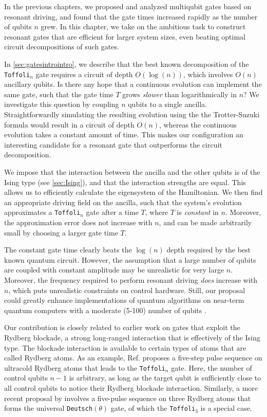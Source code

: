 In the previous chapters, we proposed and analyzed multiqubit gates based on resonant driving, and found that the gate times increased rapidly as the number of qubits $n$ grew. In this chapter, we take on the ambitious task to construct resonant gates that are efficient for larger system sizes, even beating optimal circuit decompositions of such gates. 

In \cref{sec:gatesintrointro}, we describe that the best known decomposition of the \texttt{Toffoli}$_n$ gate requires a circuit of depth $O(\log(n))$, which involves $O(n)$ ancillary qubits. Is there any hope that a continuous evolution can implement the same gate, such that the gate time $T$ grows \emph{slower} than logarithmically in $n$? We investigate this question by coupling $n$ qubits to a single ancilla. Straightforwardly simulating the resulting evolution using the the Trotter-Suzuki formula \cite{Lloyd1996} would result in a circuit of depth $O(n)$, whereas the continuous evolution takes a constant amount of time. This makes our configuration an interesting candidate for a resonant gate that outperforms the circuit decomposition. 

%

We impose that the interaction between the ancilla and the other qubits is of the Ising type (see \cref{sec:Ising}), and that the interaction strengths are equal. This allows us to efficiently calculate the eigensystem of the Hamiltonian. We then find an appropriate driving field on the ancilla, such that the system's evolution approximates a \texttt{Toffoli}$_n$ gate after a time $T$, where $T$ is \emph{constant} in $n$. Moreover, the approximation error does not increase with $n$, and can be made arbitrarily small by choosing a larger gate time $T$. 

%

The constant gate time clearly beats the $\log(n)$ depth required by the best known quantum circuit. However, the assumption that a large number of qubits are coupled with constant amplitude may be unrealistic for very large $n$. Moreover, the frequency required to perform resonant driving \emph{does} increase with $n$, which puts unrealistic constraints on control hardware. Still, our proposal could greatly enhance implementations of quantum algorithms on near-term quantum computers with a moderate (5-100) number of qubits \cite{Preskill2018}. 

Our contribution is closely related to earlier work on gates that exploit the Rydberg blockade, a strong long-ranged interaction that is effectively of the Ising type. The blockade interaction is available to certain types of atoms that are called Rydberg atoms. As an example, Ref. \cite{Isenhower2011} proposes a five-step pulse sequence on ultracold Rydberg atoms that leads to the \texttt{Toffoli}$_n$ gate. Here, the number of control qubits $n-1$ is arbitrary, as long as the target qubit is sufficiently close to all control qubits to notice their Rydberg blockade interaction. Similarly, a more recent proposal by \cite{Shi2018} involves a five-pulse sequence on three Rydberg atoms that forms the universal \texttt{Deutsch}$(\theta)$ gate, of which the \texttt{Toffoli}$_3$ is a special case. 

